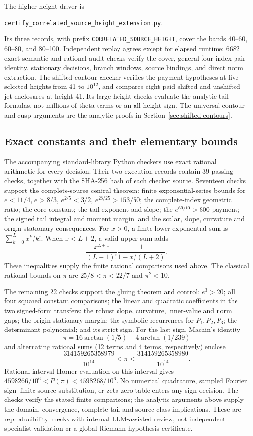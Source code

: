 \documentclass[11pt]{article}
\numberwithin{equation}{section}
\theoremstyle{definition}
\theoremstyle{remark}
\begin{document}
The higher-height driver is
\begin{center}\small
\nolinkurl{certify_correlated_source_height_extension.py}.
\end{center}
Its three records, with prefix \texttt{CORRELATED\_SOURCE\_HEIGHT},
cover the bands 40--60, 60--80, and 80--100. Independent replay agrees
except for elapsed runtime; 6682 exact semantic and rational audit
checks verify the cover, general four-index pair identity, stationary
decisions, branch windows, source bindings, and direct norm extraction.
The shifted-contour checker verifies the payment hypotheses at five
selected heights from 41 to \(10^{12}\), and compares eight paid
shifted and unshifted jet enclosures at height 41. Its large-height
checks evaluate the analytic tail formulas, not millions of theta
terms or an all-height sign. The universal contour and cusp arguments
are the analytic proofs in Section~\ref{sec:shifted-contours}.

\subsection{Exact constants and their elementary bounds}
\label{app:theta-reproducibility}

The accompanying standard-library Python checkers use exact rational
arithmetic for every decision.  Their two execution records contain
39 passing checks, together with the SHA-256 hash of each checker
source.  Seventeen checks support the complete-source central theorem:
finite exponential-series bounds for \(e<11/4\), \(e>8/3\),
\(e^{2/5}<3/2\), \(e^{28/25}>153/50\);
the complete-index geometric ratio; the core constant; the tail
exponent and slope; the \(e^{69/10}>800\) payment; the signed tail
integral and moment margin; and the scalar, slope, curvature and
origin stationary consequences.
For \(x>0\), a finite lower exponential sum is
\(\sum_{k=0}^Lx^k/k!\).  When \(x<L+2\), a valid upper sum adds
\[
 \frac{x^{L+1}}{(L+1)!}\frac1{1-x/(L+2)}.
\]
These inequalities supply the finite rational comparisons used above.
The classical rational bounds on \(\pi\) are
\(25/8<\pi<22/7\) and \(\pi^2<10\).

The remaining 22 checks support the gluing theorem and control:
\(e^3>20\); all four squared constant comparisons;
the linear and quadratic coefficients in the two signed-form
transfers; the robust slope, curvature, inner-value and norm gaps;
the origin stationary margin; the symbolic recurrences for
\(P_1,P_2,P_3\); the determinant polynomial; and its strict sign.
For the last sign, Machin's identity
\[
 \pi=16\arctan(1/5)-4\arctan(1/239)
\]
and alternating rational sums (12 terms and 4 terms, respectively)
enclose
\[
 \frac{314159265358979}{10^{14}}<\pi<
 \frac{314159265358980}{10^{14}}.
\]
Rational interval Horner evaluation on this interval gives
\(4598266/10^6<P(\pi)<4598268/10^6\).
No numerical quadrature, sampled Fourier sign, finite-source
substitution, or zeta-zero table enters any sign decision.
The checks verify the stated finite comparisons; the analytic
arguments above supply the domain, convergence, complete-tail and
source-class implications.  These are reproducibility checks with
internal LLM-assisted review, not independent specialist validation
or a global Riemann-hypothesis certificate.
\end{document}
